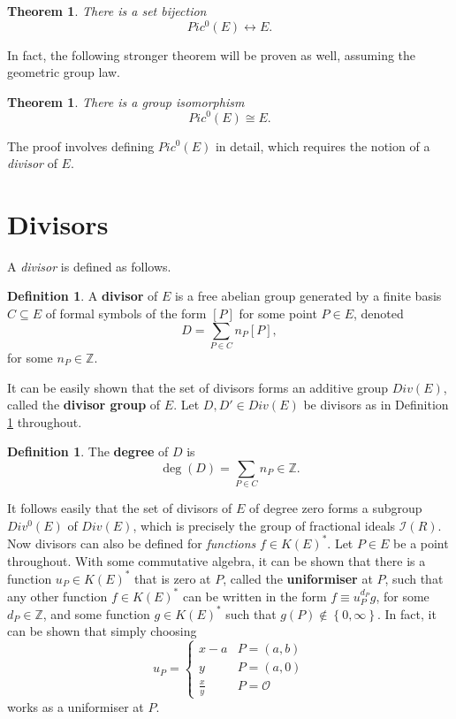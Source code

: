 \documentclass{article}
\theoremstyle{plain}
\newtheorem{theorem}[n]{Theorem}
\theoremstyle{definition}
\newtheorem{definition}[n]{Definition}
\newcommand{\rb}[1]{\left( #1 \right)}
\renewcommand{\sb}[1]{\left[ #1 \right]}
\newcommand{\cb}[1]{\left\{ #1 \right\}}
\newcommand{\Z}{\mathbb{Z}}
\newcommand{\II}{\mathcal{I}}
\newcommand{\OO}{\mathcal{O}}
\begin{document}
\begin{theorem}
\label{thm:bijection}
There is a set bijection
$$ Pic^0\rb{E} \leftrightarrow E. $$
\end{theorem}

In fact, the following stronger theorem will be proven as well, assuming the geometric group law.

\begin{theorem}
\label{thm:isomorphism}
There is a group isomorphism
$$ Pic^0\rb{E} \cong E. $$
\end{theorem}

The proof involves defining $ Pic^0\rb{E} $ in detail, which requires the notion of a \emph{divisor} of $ E $.

\pagebreak

\section{Divisors}

A \emph{divisor} is defined as follows.

\begin{definition}
\label{def:divisor}
A \textbf{divisor} of $ E $ is a free abelian group generated by a finite basis $ C \subseteq E $ of formal symbols of the form $ \sb{P} $ for some point $ P \in E $, denoted
$$ D = \sum_{P \in C} n_P\sb{P}, $$
for some $ n_P \in \Z $.
\end{definition}

It can be easily shown that the set of divisors forms an additive group $ Div\rb{E} $, called the \textbf{divisor group} of $ E $. Let $ D, D' \in Div\rb{E} $ be divisors as in Definition \ref{def:divisor} throughout.

\begin{definition}
The \textbf{degree} of $ D $ is
$$ \deg\rb{D} = \sum_{P \in C} n_P \in \Z. $$
\end{definition}

It follows easily that the set of divisors of $ E $ of degree zero forms a subgroup $ Div^0\rb{E} $ of $ Div\rb{E} $, which is precisely the group of fractional ideals $ \II\rb{R} $. Now divisors can also be defined for \emph{functions} $ f \in K\rb{E}^* $. Let $ P \in E $ be a point throughout. With some commutative algebra, it can be shown that there is a function $ u_P \in K\rb{E}^* $ that is zero at $ P $, called the \textbf{uniformiser} at $ P $, such that any other function $ f \in K\rb{E}^* $ can be written in the form $ f \equiv u_P^{d_P}g $, for some $ d_P \in \Z $, and some function $ g \in K\rb{E}^* $ such that $ g\rb{P} \notin \cb{0, \infty} $. In fact, it can be shown that simply choosing
$$ u_P =
\begin{cases}
x - a & P = \rb{a, b} \\
y & P = \rb{a, 0} \\
\tfrac{x}{y} & P = \OO
\end{cases}
$$
works as a uniformiser at $ P $.
\end{document}
